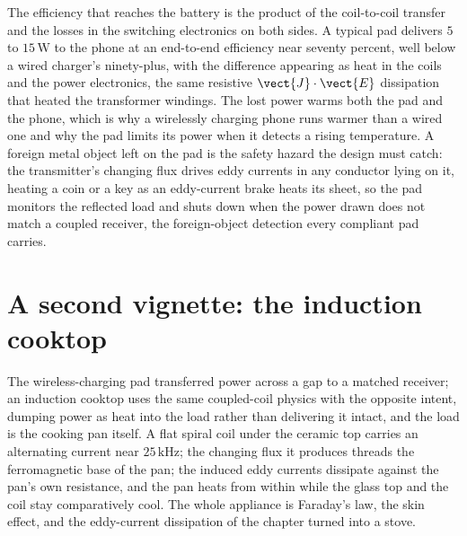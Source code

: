 

The efficiency that reaches the battery is the product of the coil-to-coil
transfer and the losses in the switching electronics on both sides. A
typical pad delivers $5$ to $15\,\si{\watt}$ to the phone at an
end-to-end efficiency near seventy percent, well below a wired charger's
ninety-plus, with the difference appearing as heat in the coils and the
power electronics, the same resistive $\vect{J}\cdot\vect{E}$ dissipation
that heated the transformer windings. The lost power warms both the pad
and the phone, which is why a wirelessly charging phone runs warmer than a
wired one and why the pad limits its power when it detects a rising
temperature. A foreign metal object left on the pad is the safety hazard
the design must catch: the transmitter's changing flux drives eddy
currents in any conductor lying on it, heating a coin or a key as an
eddy-current brake heats its sheet, so the pad monitors the reflected
load and shuts down when the power drawn does not match a coupled receiver,
the foreign-object detection every compliant pad carries.

\section{A second vignette: the induction cooktop}

The wireless-charging pad transferred power across a gap to a matched
receiver; an induction cooktop uses the same coupled-coil physics with the
opposite intent, dumping power as heat into the load rather than delivering
it intact, and the load is the cooking pan itself. A flat spiral coil under
the ceramic top carries an alternating current near $25\,\si{\kilo\hertz}$;
the changing flux it produces threads the ferromagnetic base of the pan;
the induced eddy currents dissipate against the pan's own resistance, and
the pan heats from within while the glass top and the coil stay
comparatively cool. The whole appliance is Faraday's law, the skin effect,
and the eddy-current dissipation of the chapter turned into a stove.

